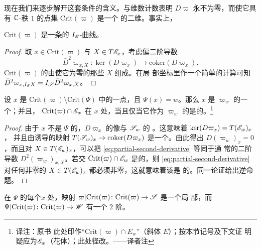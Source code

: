 现在我们来逐步解开这套条件的含义。\trGenericity{}与维数计数表明 $D\varpi$
永不为零，而使它具有 $\mathbb{C}$-秩 $1$ 的点集 $\mathrm{Crit}(\varpi)$ 是一个%
\trSmooth
的二维\trSubmanifold。事实上，
\begin{lemma}\label{thm:crit-curve-holomorphic}
$\mathrm{Crit}(\varpi)$ 是一条\trSmooth{}的 $I_{\mathscr{E}}$-\trHolomorphic{}曲线。
\end{lemma}
\begin{proof}
取 $x\in\mathrm{Crit}(\varpi)$ 与 $X\in T\mathscr{E}_x$，考虑偏二阶导数
\begin{equation}\label{eq:partial-second-derivative}
\bar{D}^2\varpi_{x,X}\colon\ker(D\varpi_x)\longrightarrow
\mathrm{coker}(D\varpi_x).
\end{equation}
$\mathrm{Crit}(\varpi)$ 的\trTangentSpace{}由使它为零的那些 $X$ 组成。在局
部坐标里作一个简单的计算可知
$\bar{D}^2\varpi_{x,I_{\mathscr{E}}X}=I_{\mathscr{S}}\bar{D}^2\varpi_{x,X}$。
\end{proof}
\begin{lemma}\label{thm:crit-intersection-transverse}
设 $x$ 是 $\mathrm{Crit}(\varpi)\setminus\mathrm{Crit}(\Psi)$ 中的一点，且
$\Psi(x)=w$。那么 $x$ 是 $\varpi_w$ 的一个\trCriticalPoint；并且，
$\mathrm{Crit}(\varpi)\cap\mathscr{E}_w$ 在 $x$ 处\trTransverse，当且仅当它作为
$\varpi_w$ 的\trCriticalPoint{}是\trNondegenerate{}的。\footnote{译注：原书
此处印作“$\mathrm{Crit}(\varpi)\cap E_w$”（斜体 $E$）；按本节记号及下文证
明疑应为\trFiber{}$\mathscr{E}_w$（花体）；此处径改。——译者注}
\end{lemma}
\begin{proof}
由于 $x$ 不是 $\Psi$ 的\trCriticalPoint，$D\varpi_x$ 的像与 $\mathscr{S}_w$ 的%
\trTangentSpace{}\trTransverse。这意味着 $\ker(D\varpi_x)=T(\mathscr{E}_w)_x$，
并且由\trInclusionMap{}诱导的映射 $T(\mathscr{S}_w)_x\to\mathrm{coker}(D\varpi_x)$
是一个\trIsomorphism。由此得出 $D(\varpi_w)_x=0$，而且对
$X\in T(\mathscr{E}_w)_x$，可以把 \eqref{eq:partial-second-derivative} 等同于通
常的二阶导数 $D^2(\varpi_w)_{x,X}$。若交 $\mathrm{Crit}(\varpi)\cap\mathscr{E}_w$
是\trTransverse{}的，则 \eqref{eq:partial-second-derivative} 对任何非零的
$X\in T(\mathscr{E}_w)_x$ 都必须非零，这就意味着该\trCriticalPoint{}是%
\trNondegenerate{}的。同一论证给出逆命题。
\end{proof}
\begin{lemma}\label{thm:crit-local-embedding}
在 $\Psi$ 的每个\trCriticalPoint{}$x$ 处，映射
$\varpi|\mathrm{Crit}(\varpi)\colon\mathrm{Crit}(\varpi)\to\mathscr{S}$ 是一个局
部\trEmbedding，而 $\Psi|\mathrm{Crit}(\varpi)\colon\mathrm{Crit}(\varpi)\to\mathscr{W}$
有一个 $2$ 阶\trBranchPoint。
\end{lemma}
